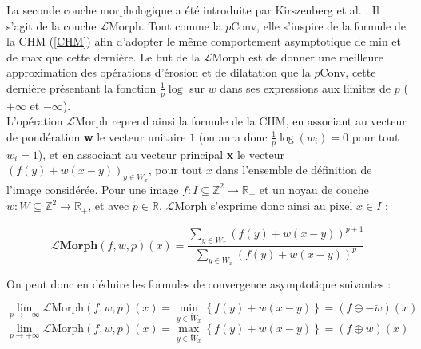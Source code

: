 La seconde couche morphologique a été introduite par Kirszenberg et al. \cite{Kirszenberg_2021}. Il s'agit de la couche $\mathcal{L}$Morph. %
Tout comme la $p$Conv, elle s'inspire de la formule de la CHM (\ref{CHM}) afin d'adopter le même comportement asymptotique de min et de max que cette dernière. Le but de la $\mathcal{L}$Morph est de donner une meilleure approximation des opérations d'érosion et de dilatation que la $p$Conv, cette dernière présentant la fonction $\frac{1}{p} \log$ sur $w$ dans ses expressions aux limites de $p$ ($+\infty$ et $-\infty$). \\

\vspace{-1.6mm}
L'opération $\mathcal{L}$Morph reprend ainsi la formule de la CHM, en associant au vecteur de pondération \textbf{w} le vecteur unitaire $1$ (on aura donc $\frac{1}{p} \log{(w_i)} = 0$ pour tout $w_i = 1$), et en associant au vecteur principal \textbf{x} le vecteur $(f(y)+w(x-y))_{y \in \breve{W}_x}$, pour tout $x$ dans l'ensemble de définition de l'image considérée. Pour une image $f: I \subseteq \mathbb{Z}^2 \rightarrow \mathbb{R}_+$ et un noyau de couche $w: W \subseteq \mathbb{Z}^2 \rightarrow \mathbb{R}_+$, et avec $p \in \mathbb{R}$, $\mathcal{L}$Morph s'exprime donc ainsi au pixel $x \in I$ :

\vspace{-2.8mm}
\begin{equation}
    \pmb{\mathcal{L}}\textbf{Morph} (f,w,p)(x) = \frac{\sum_{y \in \breve{W}_x} (f(y) + w(x-y))^{p+1}}{\sum_{y \in \breve{W}_x} (f(y) + w(x-y))^p}
    \label{LMorph}
\end{equation}

\vspace{4.4mm}
\noindent On peut donc en déduire les formules de convergence asymptotique suivantes :

\begin{equation*} 
    \lim_{p \rightarrow -\infty} \mathcal{L}\text{Morph}(f,w,p)(x) = \min_{y \in \breve{W}_x} \left \{ f(y) + w(x-y) \right \} = \left ( f \ominus -\breve{w} \right )(x)
\end{equation*} 
\begin{equation*} 
    \lim_{p \rightarrow +\infty} \mathcal{L}\text{Morph}(f,w,p)(x) = \max_{y \in \breve{W}_x} \left \{ f(y) + w(x-y) \right \} = \left ( f \oplus w \right )(x)
\end{equation*}

